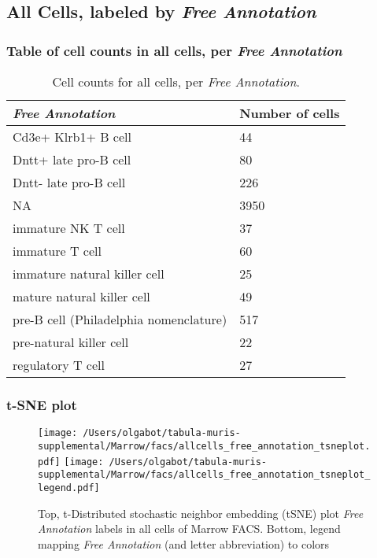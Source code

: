 \clearpage

\subsection{All Cells, labeled by \emph{Free Annotation}}
\subsubsection{Table of cell counts in all cells, per \emph{Free Annotation}}\begin{table}[h]
\centering
\label{my-label}
\begin{tabular}{@{}ll@{}}
\toprule

\emph{Free Annotation}& Number of cells \\ \midrule
Cd3e+ Klrb1+ B cell & 44 \\

Dntt+ late pro-B cell & 80 \\

Dntt- late pro-B cell & 226 \\

NA & 3950 \\

immature NK T cell & 37 \\

immature T cell & 60 \\

immature natural killer cell & 25 \\

mature natural killer cell & 49 \\

pre-B cell (Philadelphia nomenclature) & 517 \\

pre-natural killer cell & 22 \\

regulatory T cell & 27 \\
\bottomrule
\end{tabular}
\caption{Cell counts for all cells, per \emph{Free Annotation}.}
\end{table}

\clearpage
\subsubsection{t-SNE plot}
\begin{figure}[h]
\centering
\texttt{[image: /Users/olgabot/tabula-muris-supplemental/Marrow/facs/allcells\_free\_annotation\_tsneplot.pdf]}
\texttt{[image: /Users/olgabot/tabula-muris-supplemental/Marrow/facs/allcells\_free\_annotation\_tsneplot\_legend.pdf]}
\caption{Top, t-Distributed stochastic neighbor embedding (tSNE) plot  \emph{Free Annotation} labels in all cells of Marrow FACS. Bottom, legend mapping \emph{Free Annotation} (and letter abbreviation) to colors}
\end{figure}


